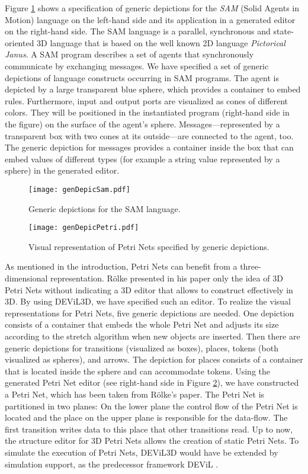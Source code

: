 \documentclass[a4paper]{article}
\newcommand{\dev}{DEViL3D\xspace}
\begin{document}
Figure \ref{fig:sam} shows a specification of generic depictions for the \emph{SAM} (Solid Agents in Motion) language on the left-hand side and its application in a generated editor on the right-hand side. The SAM language \cite{GMR98} is a parallel, synchronous and state-oriented 3D language that is based on the well known 2D language \emph{Pictorical Janus}. A SAM program describes a set of agents that synchronously communicate by exchanging messages. We have specified a set of generic depictions of language constructs occurring in SAM programs. The agent is depicted by a large transparent blue sphere, which provides a container to embed rules. Furthermore, input and output ports are visualized as cones of different colors. They will be positioned in the instantiated program (right-hand side in the figure) on the surface of the agent's sphere. Messages---represented by a transparent box with two cones at its outside---are connected to the agent, too. The generic depiction for messages provides a container inside the box that can embed values of different types (for example a string value represented by a sphere) in the generated editor.

\begin{figure}[!ht]
  \centering
  \texttt{[image: genDepicSam.pdf]}
  \caption{Generic depictions for the SAM language.}
  \label{fig:sam}
\end{figure}

\begin{figure}[!ht]
  \centering
  \texttt{[image: genDepicPetri.pdf]}
  \caption{Visual representation of Petri Nets specified by generic depictions.}
  \label{fig:petri}
\end{figure}


As mentioned in the introduction, Petri Nets can benefit from a three-dimensional representation. R\"{o}lke \cite{Roel07} presented in his paper only the idea of 3D Petri Nets without indicating a 3D editor that allows to construct effectively in 3D. By using \dev, we have specified such an editor. To realize the visual representations for Petri Nets, five generic depictions are needed. One depiction consists of a container that embeds the whole Petri Net and adjusts its size according to the stretch algorithm when new objects are inserted. Then there are generic depictions for transitions (visualized as boxes), places, tokens (both visualized as spheres), and arrows. The depiction for places consists of a container that is located inside the sphere and can accommodate tokens. Using the generated Petri Net editor (see right-hand side in Figure \ref{fig:petri}), we have constructed a Petri Net, which has been taken from R\"{o}lke's paper. The Petri Net is partitioned in two planes: On the lower plane the control flow of the Petri Net is located and the place on the upper plane is responsible for the data-flow. The first transition writes data to this place that other transitions read. Up to now, the structure editor for 3D Petri Nets allows the creation of static Petri Nets. To simulate the execution of Petri Nets, \dev would have be extended by simulation support, as the predecessor framework DEViL \cite{CK09}.
\end{document}
